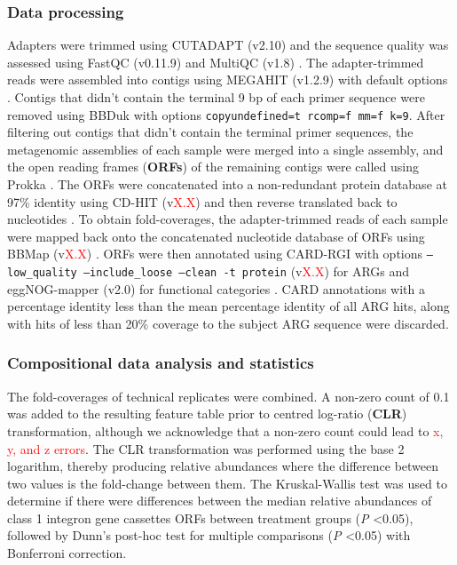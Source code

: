 \subsubsection{Data processing}

Adapters were trimmed using CUTADAPT (v2.10) and the sequence quality was assessed using FastQC (v0.11.9) and MultiQC (v1.8) \parencite{martinCutadaptRemovesAdapter2011, andrewsFastQCQualityControl2010, ewelsMultiQCSummarizeAnalysis2016}.
The adapter-trimmed reads were assembled into contigs using MEGAHIT (v1.2.9) with default options \parencite{liMEGAHITUltrafastSinglenode2015}.
Contigs that didn't contain the terminal 9 bp of each primer sequence were removed using BBDuk with options \texttt{copyundefined=t rcomp=f mm=f k=9}.
After filtering out contigs that didn't contain the terminal primer sequences, the metagenomic assemblies of each sample were merged into a single assembly, and the open reading frames (\textbf{ORFs}) of the remaining contigs were called using Prokka \parencite{bushnellBBMap2020, seemannProkkaRapidProkaryotic2014}.
The ORFs were concatenated into a non-redundant protein database at 97\% identity using CD-HIT (v\textcolor{red}{X.X}) and then reverse translated back to nucleotides \parencite{liCDHITFastProgram2006, fuCDHITAcceleratedClustering2012}.
To obtain fold-coverages, the adapter-trimmed reads of each sample were mapped back onto the concatenated nucleotide database of ORFs using BBMap (v\textcolor{red}{X.X}) \parencite{bushnellBBMap2020}.
ORFs were then annotated using CARD-RGI with options \texttt{--low\_quality --include\_loose --clean -t protein} (v\textcolor{red}{X.X}) for ARGs and eggNOG-mapper (v2.0) for functional categories \parencite{alcockCARD2020Antibiotic2019, huerta-cepasFastGenomewideFunctional2017, huerta-cepasEggNOGHierarchicalFunctionally2019}.
CARD annotations with a percentage identity less than the mean percentage identity of all ARG hits, along with hits of less than 20\% coverage to the subject ARG sequence were discarded.

\subsubsection{Compositional data analysis and statistics}

The fold-coverages of technical replicates were combined.
A non-zero count of 0.1 was added to the resulting feature table prior to centred log-ratio (\textbf{CLR}) transformation, although we acknowledge that a non-zero count could lead to \textcolor{red}{x, y, and z errors}.
The CLR transformation was performed using the base 2 logarithm, thereby producing relative abundances where the difference between two values is the fold-change between them.
The Kruskal-Wallis test was used to determine if there were differences between the median relative abundances of class 1 integron gene cassettes ORFs between treatment groups (\textit{P} \textless 0.05), followed by Dunn's post-hoc test for multiple comparisons (\textit{P} \textless 0.05) with Bonferroni correction.
